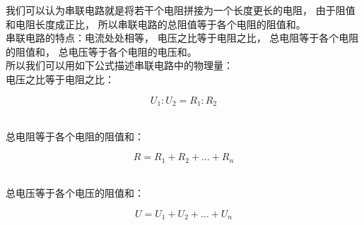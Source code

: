 \documentclass[UTF8]{ctexart}
\begin{document}
    我们可以认为串联电路就是将若干个电阻拼接为一个长度更长的电阻，
    由于阻值和电阻长度成正比，
    所以串联电路的总阻值等于各个电阻的阻值和。\\[3mm]
    串联电路的特点：电流处处相等，
    电压之比等于电阻之比，
    总电阻等于各个电阻的阻值和，
    总电压等于各个电阻的电压和。\\[3mm]
    所以我们可以用如下公式描述串联电路中的物理量：\\[3mm]
    电压之比等于电阻之比：
    \begin{large}
        \begin{equation*}
            U_1:U_2=R_1:R_2
        \end{equation*}
    \end{large}\\[3mm]
    总电阻等于各个电阻的阻值和：
    \begin{large}
        \begin{equation*}
            R=R_1+R_2+\hdots+R_n       
        \end{equation*}
    \end{large}\\[3mm]
    总电压等于各个电压的阻值和：
    \begin{large}
        \begin{equation*}
            U=U_1+U_2+\hdots+U_n
        \end{equation*}
    \end{large}\\[3mm]

\newpage
\end{document}
